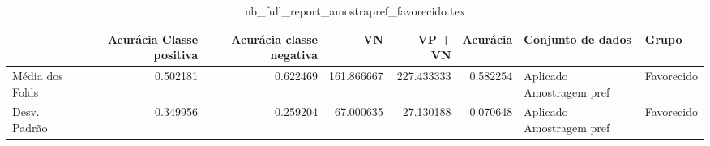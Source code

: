 \begin{table}
\centering
\caption{nb_full_report_amostrapref_favorecido.tex}
\label{nb_full_report_amostrapref_favorecido.tex}
\begin{tabular}{lrrrrrll}
\toprule
{}              &  Acurácia Classe positiva &  Acurácia classe negativa &         VN  &    VP + VN  &  Acurácia &         Conjunto de dados &       Grupo \\
\midrule
Média dos Folds &                  0.502181 &                  0.622469 &  161.866667 &  227.433333 &  0.582254 &  Aplicado Amostragem pref &  Favorecido \\
Desv. Padrão    &                  0.349956 &                  0.259204 &   67.000635 &   27.130188 &  0.070648 &  Aplicado Amostragem pref &  Favorecido \\
\bottomrule
\end{tabular}
\end{table}
